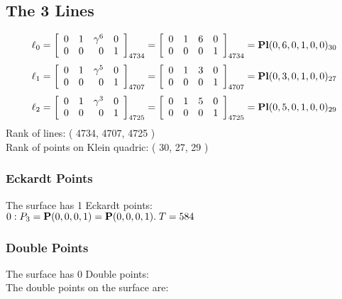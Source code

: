 \documentclass{article}
\newcommand{\bP}{{\bf P}}
\begin{document}
{\subsection*{The 3 Lines}
$$
\ell_{0} = 
\left[
\begin{array}{*{4}{r}}
0 & 1 & \gamma^{6} & 0\\
0 & 0 & 0 & 1\\
\end{array}
\right]
_{4734}
=
\left[
\begin{array}{*{4}c}
0  & 1  & 6  & 0\\
0  & 0  & 0  & 1\\
\end{array}
\right]_{4734}
={\rm\bf Pl}(0,6,0,1,0,0 )_{30}$$
$$
\ell_{1} = 
\left[
\begin{array}{*{4}{r}}
0 & 1 & \gamma^{5} & 0\\
0 & 0 & 0 & 1\\
\end{array}
\right]
_{4707}
=
\left[
\begin{array}{*{4}c}
0  & 1  & 3  & 0\\
0  & 0  & 0  & 1\\
\end{array}
\right]_{4707}
={\rm\bf Pl}(0,3,0,1,0,0 )_{27}$$
$$
\ell_{2} = 
\left[
\begin{array}{*{4}{r}}
0 & 1 & \gamma^{3} & 0\\
0 & 0 & 0 & 1\\
\end{array}
\right]
_{4725}
=
\left[
\begin{array}{*{4}c}
0  & 1  & 5  & 0\\
0  & 0  & 0  & 1\\
\end{array}
\right]_{4725}
={\rm\bf Pl}(0,5,0,1,0,0 )_{29}$$
Rank of lines: ( 4734, 4707, 4725 )\\
Rank of points on Klein quadric: ( 30, 27, 29 )\\
\subsubsection*{Eckardt Points}
The surface has 1 Eckardt points:\\
$0 : P_{3}=\bP(0, 0, 0, 1) = \bP(0, 0, 0, 1).\; T= 584$\\
\subsubsection*{Double Points}
The surface has 0 Double points:\\
The double points on the surface are:\\
\begin{multicols}{2}
\noindent
\end{multicols}
}
\end{document}
